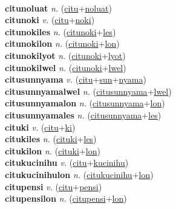  \label{citulyan} \\
\textbf{citunoluat} \textit{n.} (\hyperref[citu]{citu}+\hyperref[noluat]{noluat})
 \label{citunoluat} \\
\textbf{citunoki} \textit{v.} (\hyperref[citu]{citu}+\hyperref[noki]{noki})
 \label{citunoki} \\
\textbf{citunokiles} \textit{n.} (\hyperref[citunoki]{citunoki}+\hyperref[les]{les})
 \label{citunokiles} \\
\textbf{citunokilon} \textit{n.} (\hyperref[citunoki]{citunoki}+\hyperref[lon]{lon})
 \label{citunokilon} \\
\textbf{citunokilyot} \textit{n.} (\hyperref[citunoki]{citunoki}+\hyperref[lyot]{lyot})
 \label{citunokilyot} \\
\textbf{citunokilwel} \textit{n.} (\hyperref[citunoki]{citunoki}+\hyperref[lwel]{lwel})
 \label{citunokilwel} \\
\textbf{citusunnyama} \textit{v.} (\hyperref[citu]{citu}+\hyperref[sun]{sun}+\hyperref[nyama]{nyama})
 \label{citusunnyama} \\
\textbf{citusunnyamalwel} \textit{n.} (\hyperref[citusunnyama]{citusunnyama}+\hyperref[lwel]{lwel})
 \label{citusunnyamalwel} \\
\textbf{citusunnyamalon} \textit{n.} (\hyperref[citusunnyama]{citusunnyama}+\hyperref[lon]{lon})
 \label{citusunnyamalon} \\
\textbf{citusunnyamales} \textit{n.} (\hyperref[citusunnyama]{citusunnyama}+\hyperref[les]{les})
 \label{citusunnyamales} \\
\textbf{cituki} \textit{v.} (\hyperref[citu]{citu}+\hyperref[ki]{ki})
 \label{cituki} \\
\textbf{citukiles} \textit{n.} (\hyperref[cituki]{cituki}+\hyperref[les]{les})
 \label{citukiles} \\
\textbf{citukilon} \textit{n.} (\hyperref[cituki]{cituki}+\hyperref[lon]{lon})
 \label{citukilon} \\
\textbf{citukucinihu} \textit{v.} (\hyperref[citu]{citu}+\hyperref[kucinihu]{kucinihu})
 \label{citukucinihu} \\
\textbf{citukucinihulon} \textit{n.} (\hyperref[citukucinihu]{citukucinihu}+\hyperref[lon]{lon})
 \label{citukucinihulon} \\
\textbf{citupensi} \textit{v.} (\hyperref[citu]{citu}+\hyperref[pensi]{pensi})
 \label{citupensi} \\
\textbf{citupensilon} \textit{n.} (\hyperref[citupensi]{citupensi}+\hyperref[lon]{lon})
 \label{citupensilon} \\
